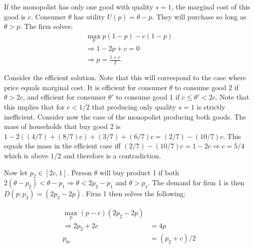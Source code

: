 \documentclass[11pt]{article} %
\begin{document}
If the monopolist has only one good with quality $s=1$, the marginal cost of this good is $c$. Consumer $\theta$ has utility $U(p) = \theta - p$. They will purchase so long as $\theta>p$. The firm solves:
\begin{align*}
\max_{p} p(1-p) - c(1-p) \\
\Rightarrow 1 - 2p +c = 0 \\
\Rightarrow p = \frac{1+c}{2}.
\end{align*}


Consider the efficient solution. Note that this will correspond to the case where price equals marginal cost. It is efficient for consumer $\theta$ to consume good $2$ if $\theta>2c$, and efficient for consumer $\theta'$ to consume good 1 if $c\leq \theta' < 2c$. Note that this implies that for $c<1/2$ that producing only quality $s=1$ is strictly inefficient. Consider now the case of the monopolist producing both goods. The mass of households that buy good 2 is $1 - 2((4/7) + (8/7)c) + (3/7) +(6/7)c = (2/7) - (10/7)c$. This equals the mass in the efficient case iff $ (2/7) - (10/7)c = 1 - 2c \Rightarrow c = 5/4$ which is above $1/2$ and therefore is a contradiction.

Now let $p_2 \in [2c,1]$. Person $\theta$ will buy product 1 if both $2(\theta - p_2)<\theta - p_1 \Rightarrow \theta<2p_2 - p_1$ and $\theta>p_1$. The demand for firm 1 is then $D(p;p_2) = (2p_2 - 2p)$. Firm 1 then solves the following:

\begin{align*}
\max_{p} (p-c)(2p_2 - 2p)\\
\Rightarrow 2p_2 + 2c &= 4p\\
p_{br} &= (p_2+c)/2
\end{align*}
\end{document}
